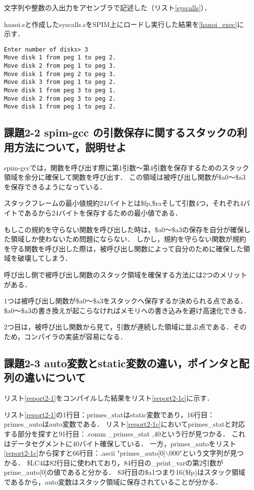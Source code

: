 \documentclass[11pt]{jarticle}
\begin{document}
文字列や整数の入出力をアセンブラで記述した（リスト\ref{syscalls}）．

hanoi.sと作成したsyscalls.sをSPIM上にロードし実行した結果を\ref{hanoi_exec}に示す．

\begin{lstlisting}[caption=実行結果,label=hanoi_exec]
Enter number of disks> 3
Move disk 1 from peg 1 to peg 2.
Move disk 2 from peg 1 to peg 3.
Move disk 1 from peg 2 to peg 3.
Move disk 3 from peg 1 to peg 2.
Move disk 1 from peg 3 to peg 1.
Move disk 2 from peg 3 to peg 2.
Move disk 1 from peg 1 to peg 2.
\end{lstlisting}

\subsection{課題2-2 spim-gcc の引数保存に関するスタックの利用方法について，説明せよ}

spim-gccでは，関数を呼び出す際に第1引数～第4引数を保存するためのスタック領域を余分に確保して関数を呼び出す．
この領域は被呼び出し関数が\$a0～\$a3を保存できるようになっている．

スタックフレームの最小値規約24バイトとは\$fp,\$raそして引数4つ，それぞれ4バイトであるから24バイトを保存するための最小値である．

もしこの規約を守らない関数を呼び出した時は，\$a0～\$a3の保存を自分が確保した領域しか使わないため問題にならない．
しかし，規約を守らない関数が規約を守る関数を呼び出した際は，被呼び出し関数によって自分のために確保した領域を破壊してしまう．

呼び出し側で被呼び出し関数のスタック領域を確保する方法には2つのメリットがある．

1つは被呼び出し関数が\$a0～\$a3をスタックへ保存するか決められる点である．
\$a0～\$a3の書き換えが起こらなければメモリへの書き込みを避け高速化できる．

2つ目は，被呼び出し関数から見て，引数が連続した領域に並ぶ点である．そのため，コンパイラの実装が容易になる．

\subsection{課題2-3 auto変数とstatic変数の違い，ポインタと配列の違いについて}

リスト\ref{report2-1}をコンパイルした結果をリスト\ref{report2-1c}に示す．

リスト\ref{report2-1}の1行目：primes\_statはstatic変数であり，16行目：primes\_autoはauto変数である．
リスト\ref{report2-1c}においてprimes\_statと対応する部分を探すと91行目：.comm \_primes\_stat ,40という行が見つかる．
これはデータセグメントに40バイト確保している．
一方，primes\_autoをリスト\ref{report2-1c}から探すと66行目：.ascii "primes\_auto[0]$\backslash$000"という文字列が見つかる．
\$LC4は82行目に使われており，84行目の\_print\_varの第2引数がprime\_auto[0]の値であると分かる．
83行目の\$a1つまり16(\$fp)はスタック領域であるから，auto変数はスタック領域に保存されていることが分かる．
\end{document}
